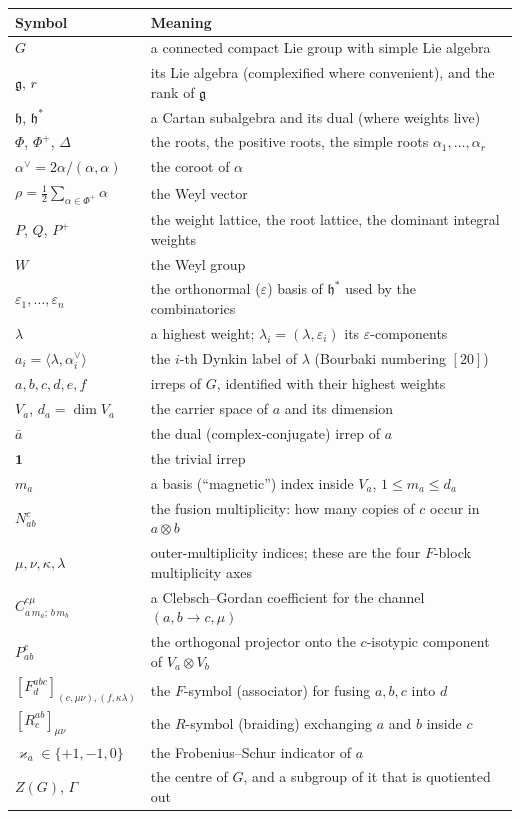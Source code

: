 \documentclass[11pt,a4paper]{article}
\theoremstyle{plain}
\theoremstyle{definition}
\newcommand{\g}{\mathfrak{g}}
\newcommand{\dual}[1]{\bar{#1}}
\begin{document}
\noindent
\begin{tabular}{@{}ll@{}}
\toprule
Symbol & Meaning \\
\midrule
$G$ & a connected compact Lie group with simple Lie algebra \\
$\g$, $r$ & its Lie algebra (complexified where convenient), and the rank of $\g$ \\
$\mathfrak{h}$, $\mathfrak{h}^*$ & a Cartan subalgebra and its dual (where weights live) \\
$\Phi$, $\Phi^+$, $\Delta$ & the roots, the positive roots, the simple roots $\alpha_1,\dots,\alpha_r$ \\
$\alpha^\vee = 2\alpha/(\alpha,\alpha)$ & the coroot of $\alpha$ \\
$\rho = \tfrac12\sum_{\alpha\in\Phi^+}\alpha$ & the Weyl vector \\
$P$, $Q$, $P^+$ & the weight lattice, the root lattice, the dominant integral weights \\
$W$ & the Weyl group \\
$\varepsilon_1,\dots,\varepsilon_n$ & the orthonormal ($\varepsilon$) basis of $\mathfrak{h}^*$ used by the combinatorics \\
$\lambda$ & a highest weight; $\lambda_i = (\lambda,\varepsilon_i)$ its $\varepsilon$-components \\
$a_i = \langle\lambda,\alpha_i^\vee\rangle$ & the $i$-th Dynkin label of $\lambda$ (Bourbaki numbering $[20]$) \\
$a,b,c,d,e,f$ & irreps of $G$, identified with their highest weights \\
$V_a$, $d_a=\dim V_a$ & the carrier space of $a$ and its dimension \\
$\dual a$ & the dual (complex-conjugate) irrep of $a$ \\
$\mathbf{1}$ & the trivial irrep \\
$m_a$ & a basis (``magnetic'') index inside $V_a$, $1\le m_a\le d_a$ \\
$N^c_{ab}$ & the fusion multiplicity: how many copies of $c$ occur in $a\otimes b$ \\
$\mu,\nu,\kappa,\lambda$ & outer-multiplicity indices; these are the four $F$-block multiplicity axes\footnotemark \\
$C^{c\mu}_{a\,m_a;\,b\,m_b}$ & a Clebsch--Gordan coefficient for the channel $(a,b\to c,\mu)$ \\
$P^c_{ab}$ & the orthogonal projector onto the $c$-isotypic component of $V_a\otimes V_b$ \\
$[F^{abc}_d]_{(e,\mu\nu),(f,\kappa\lambda)}$ & the $F$-symbol (associator) for fusing $a,b,c$ into $d$ \\
$[R^{ab}_c]_{\mu\nu}$ & the $R$-symbol (braiding) exchanging $a$ and $b$ inside $c$ \\
$\varkappa_a\in\{+1,-1,0\}$ & the Frobenius--Schur indicator of $a$ \\
$Z(G)$, $\Gamma$ & the centre of $G$, and a subgroup of it that is quotiented out \\
\bottomrule
\end{tabular}
\end{document}
